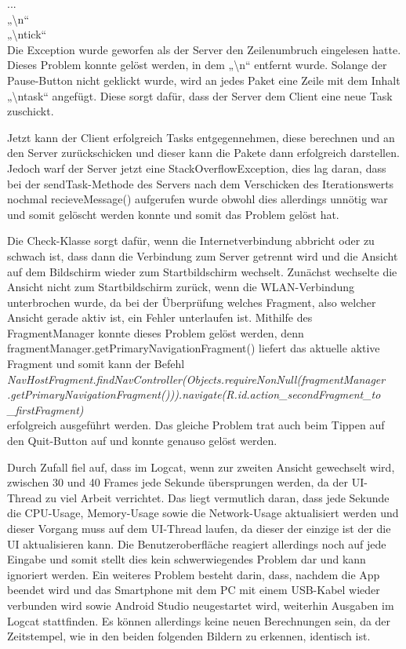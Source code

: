 \documentclass[12pt, onecolumn, notitlepage]{scrartcl}
\begin{document}
... \\
„\textbackslash n“ \\
„\textbackslash ntick“ \\
Die Exception wurde geworfen als der Server den Zeilenumbruch eingelesen hatte. Dieses Problem konnte gelöst werden, in dem „\textbackslash n“ entfernt wurde. Solange der Pause-Button nicht geklickt wurde, wird an jedes Paket eine Zeile mit dem Inhalt „\textbackslash ntask“ angefügt. Diese sorgt dafür, dass der Server dem Client eine neue Task zuschickt. \par
Jetzt kann der Client erfolgreich Tasks entgegennehmen, diese berechnen und an den Server zurückschicken und dieser kann die Pakete dann erfolgreich darstellen. Jedoch warf der Server jetzt eine StackOverflowException, dies lag daran, dass bei der sendTask-Methode des Servers nach dem Verschicken des Iterationswerts nochmal recieveMessage() aufgerufen wurde obwohl dies allerdings unnötig war und somit gelöscht werden konnte und somit das Problem gelöst hat. \par
Die Check-Klasse sorgt dafür, wenn die Internetverbindung abbricht oder zu schwach ist, dass dann die Verbindung zum Server getrennt wird und die Ansicht auf dem Bildschirm wieder zum Startbildschirm wechselt. Zunächst wechselte die Ansicht nicht zum Startbildschirm zurück, wenn die WLAN-Verbindung unterbrochen wurde, da bei der Überprüfung welches Fragment, also welcher Ansicht gerade aktiv ist, ein Fehler unterlaufen ist. Mithilfe des FragmentManager konnte dieses Problem gelöst werden, denn fragmentManager.getPrimaryNavigationFragment() liefert das aktuelle aktive Fragment und somit kann der Befehl \\
\textit{NavHostFragment.findNavController(Objects.requireNonNull(fragmentManager\\.getPrimaryNavigationFragment())).navigate(R.id.action\_secondFragment\_to\\\_firstFragment)} \\
erfolgreich ausgeführt werden. Das gleiche Problem trat auch beim Tippen auf den Quit-Button auf und konnte genauso gelöst werden. \par
Durch Zufall fiel auf, dass im Logcat, wenn zur zweiten Ansicht gewechselt wird, zwischen 30 und 40 Frames jede Sekunde übersprungen werden, da der UI-Thread zu viel Arbeit verrichtet. Das liegt vermutlich daran, dass jede Sekunde die CPU-Usage, Memory-Usage sowie die Network-Usage aktualisiert werden und dieser Vorgang muss auf dem UI-Thread laufen, da dieser der einzige ist der die UI aktualisieren kann. Die Benutzeroberfläche reagiert allerdings noch auf jede Eingabe und somit stellt dies kein schwerwiegendes Problem dar und kann ignoriert werden.
Ein weiteres Problem besteht darin, dass, nachdem die App beendet wird und das Smartphone mit dem PC mit einem USB-Kabel wieder verbunden wird sowie Android Studio neugestartet wird, weiterhin Ausgaben im Logcat stattfinden. Es können allerdings keine neuen Berechnungen sein, da der Zeitstempel, wie in den beiden folgenden Bildern zu erkennen, identisch ist.
\end{document}
